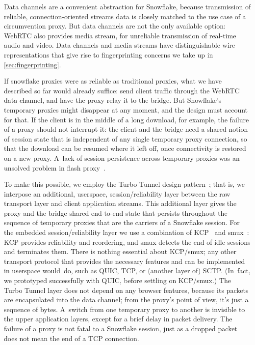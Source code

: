 \documentclass[letterpaper,twocolumn]{article}
\begin{document}
Data channels are a convenient abstraction for Snowflake,
because transmission of reliable,
connection-oriented streams data is closely matched
to the use case of a circumvention proxy.
But data channels are not the only available option:
WebRTC also provides media stream,
for unreliable transmission of real-time audio and video.
Data channels and media streams have distinguishable wire representations
that give rise to fingerprinting concerns we take up in \autoref{sec:fingerprinting}.

If snowflake proxies were as reliable as traditional proxies,
what we have described so far would already suffice:
send client traffic through the WebRTC data channel,
and have the proxy relay it to the bridge.
But Snowflake's temporary proxies might
disappear at any moment,
and the design must account for that.
If the client is in the middle of a long download,
for example, the failure of a proxy should not interrupt it:
the client and the bridge need a shared notion of session state
that is independent of any single temporary proxy connection,
so that the download can be resumed where it left off,
once connectivity is restored on a new proxy.
A~lack of session persistence across temporary proxies
was an unsolved problem in flash proxy~\cite[\S 5.2]{Fifield2012a}.

To make this possible, we employ the
Turbo Tunnel design pattern~\cite{Fifield2020a};
that is, we interpose an additional, userspace,
session/reliability layer between the raw transport layer
and client application streams.
This additional layer gives the proxy and the bridge
shared end-to-end state that persists throughout
the sequence of temporary proxies that are the carriers of a Snowflake session.
For the embedded session/reliability layer
we use a combination of
KCP~\cite{kcp} and
smux~\cite{smux}:
KCP provides reliability and reordering,
and smux detects the end of idle sessions and terminates them.
There is nothing essential about KCP/smux;
any other transport protocol that provides the necessary features
and can be implemented in userspace would~do,
such as QUIC, TCP, or (another layer of) SCTP.
(In~fact, we prototyped successfully with QUIC, before settling on KCP/smux.)
The Turbo Tunnel layer does not depend on any browser features,
because its packets are encapsulated into the data channel;
from the proxy's point of view, it's just a sequence of bytes.
A~switch from one temporary proxy to another
is invisible to the upper application layers,
except for a brief delay in packet delivery.
The failure of a proxy
is not fatal to a Snowflake session,
just as a dropped packet does not mean the end of a TCP connection.
\end{document}
